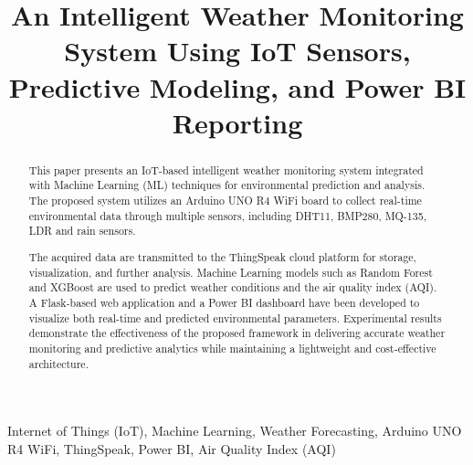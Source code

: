 \documentclass[conference]{IEEEtran}
\begin{document}
\title{An Intelligent Weather Monitoring System Using IoT Sensors, Predictive Modeling, and Power BI Reporting}

\author{



}

\maketitle

\begin{abstract}

This paper presents an IoT-based intelligent weather monitoring system integrated with Machine Learning (ML) techniques for environmental prediction and analysis. The proposed system utilizes an Arduino UNO R4 WiFi board to collect real-time environmental data through multiple sensors, including DHT11, BMP280, MQ-135, LDR and rain sensors.

The acquired data are transmitted to the ThingSpeak cloud platform for storage, visualization, and further analysis. Machine Learning models such as Random Forest and XGBoost are used to predict weather conditions and the air quality index (AQI). A Flask-based web application and a Power BI dashboard have been developed to visualize both real-time and predicted environmental parameters. Experimental results demonstrate the effectiveness of the proposed framework in delivering accurate weather monitoring and predictive analytics while maintaining a lightweight and cost-effective architecture.

\end{abstract}

\begin{IEEEkeywords}
Internet of Things (IoT), Machine Learning, Weather Forecasting, Arduino UNO R4 WiFi, ThingSpeak, Power BI, Air Quality Index (AQI)
\end{IEEEkeywords}
\end{document}
